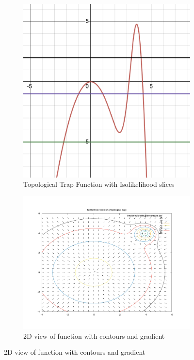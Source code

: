 \documentclass[11pt]{article}
\begin{document}
    \begin{figure}[H]
        \centering
        \begin{subfigure}[b]{0.35\linewidth}
            \centering
            \includegraphics[width=\linewidth]{../figures/topotrap/function}
            \caption{Topological Trap Function with Isolikelihood slices}
        \end{subfigure}
        \begin{subfigure}[b]{0.55\linewidth}
            \centering
            \includegraphics[width=\linewidth]{../figures/topotrap/contour}
            \caption{2D view of function with contours and gradient}
        \end{subfigure}
        \label{dig:topotrap_function}
    \end{figure}
\end{document}
